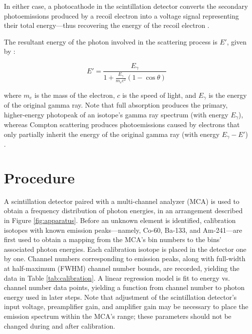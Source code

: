 \documentclass[11pt]{article}
\begin{document}
\vspace{1em}

In either case, a photocathode in the scintillation detector converts
the secondary photoemissions produced by a recoil electron
into a voltage
signal representing their total energy---thus
recovering the energy of the recoil electron \cite{mel, mich}.

\vspace{1em}

The resultant energy of the photon involved in the scattering process
is $E'$, given by \cite{harris, zwiebach, mich}:

\vspace{1em}

\begin{equation}
  \label{eq:compton_scattering}
  E' = \frac{E_\gamma}{1 + \frac{E_\gamma}{m_e c^2} (1 - \cos \theta)}
\end{equation}

\vspace{1em}

where $m_e$ is the mass of the electron, $c$ is the speed of light,
and $E_\gamma$ is the energy of the original gamma ray. Note that
full absorption produces the primary, higher-energy photopeak of an
isotope's gamma ray spectrum (with energy $E_\gamma$), whereas
Compton scattering produces
photoemissions caused by electrons that only partially
inherit the energy of the original gamma ray (with energy $E_\gamma - E'$)
\cite{harris, zwiebach}.

\section{Procedure}

A scintillation detector paired with a multi-channel
analyzer (MCA) is used to
obtain a frequency distribution of photon energies, in an arrangement
described in Figure
\ref{fig:apparatus}. Before an unknown
element is identified, calibration isotopes with
known emission peaks---namely,
Co-60, Ba-133, and Am-241---are first used to obtain a mapping from the MCA's
bin numbers to the bins' associated photon energies. Each calibration isotope
is placed in the detector
one by one. Channel numbers corresponding to emission peaks, along
with full-width at half-maximum (FWHM)
channel number bounds, are recorded, yielding the data in Table
\ref{tab:calibration}. A linear regression model is fit
to energy vs. channel
number data points, yielding a function from channel number to photon energy
used in later steps. Note that adjustment of the
scintillation detector's input voltage, preamplifier gain, and amplifier
gain may be necessary to place the emission spectrum within the MCA's
range; these
parameters should not be changed during and after calibration.
\end{document}
